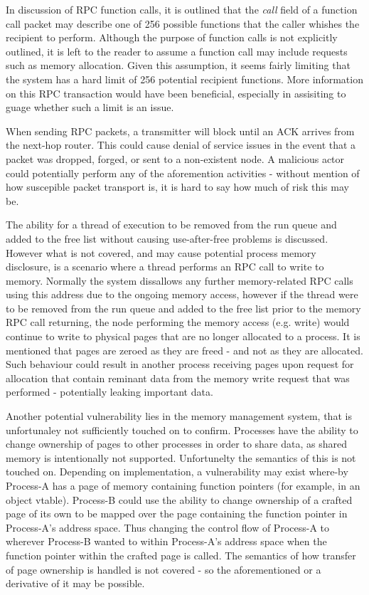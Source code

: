 \documentclass{article}
\begin{document}
In discussion of RPC function calls, it is outlined that the \textit{call} field of a function call packet may describe one of 256 possible functions that the caller whishes the recipient to perform. Although the purpose of function calls is not explicitly outlined, it is left to the reader to assume a function call may include requests such as memory allocation. Given this assumption, it seems fairly limiting that the system has a hard limit of 256 potential recipient functions. More information on this RPC transaction would have been beneficial, especially in assisiting to guage whether such a limit is an issue.

When sending RPC packets, a transmitter will block until an ACK arrives from the next-hop router. This could cause denial of service issues in the event that a packet was dropped, forged, or sent to a non-existent node. A malicious actor could potentially perform any of the aforemention activities - without mention of how  suscepible packet transport is, it is hard to say how much of risk this may be.

The ability for a thread of execution to be removed from the run queue and added to the free list without causing use-after-free problems is discussed. However what is not covered, and may cause potential process memory disclosure, is a scenario where a thread performs an RPC call to write to memory. Normally the system dissallows any further memory-related RPC calls using this address due to the ongoing memory access, however if the thread were to be removed from the run queue and added to the free list prior to the memory RPC call returning, the node performing the memory access (e.g. write) would continue to write to physical pages that are no longer allocated to a process. It is mentioned that pages are zeroed as they are freed - and not as they are allocated. Such behaviour could result in another process receiving pages upon request for allocation that contain reminant data from the memory write request that was performed - potentially leaking important data.

Another potential vulnerability lies in the memory management system, that is unfortunaley not sufficiently touched on to confirm. Processes have the ability to change ownership of pages to other processes in order to share data, as shared memory is intentionally not supported. Unfortunelty the semantics of this is not touched on. Depending on implementation, a vulnerability may exist where-by Process-A has a page of memory containing function pointers (for example, in an object vtable). Process-B could use the ability to change ownership of a crafted page of its own to be mapped over the page containing the function pointer in Process-A's address space. Thus changing the control flow of Process-A to wherever Process-B wanted to within Process-A's address space when the function pointer within the crafted page is called. The semantics of how transfer of page ownership is handled is not covered - so the aforementioned or a derivative of it may be possible.
\end{document}
